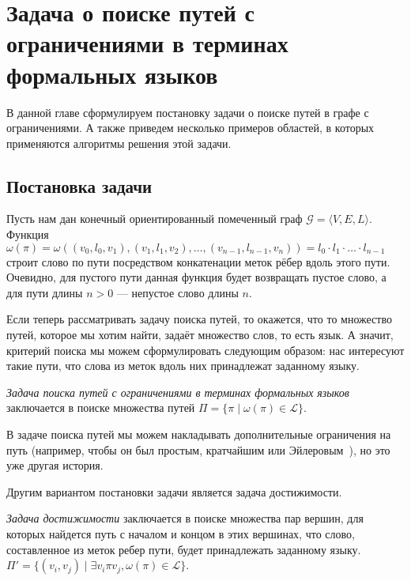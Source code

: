 \section{Задача о поиске путей с ограничениями в терминах формальных языков}



В данной главе сформулируем постановку задачи о поиске путей в графе с ограничениями. 
А также приведем несколько примеров областей, в которых применяются алгоритмы решения этой задачи.

\subsection{Постановка задачи }


Пусть нам дан конечный ориентированный помеченный граф $\mathcal{G}=\langle V,E,L \rangle$.
Функция $\omega(\pi) = \omega((v_0, l_0, v_1),(v_1,l_1,v_2),\dots,(v_{n-1},l_{n-1},v_n)) = l_0 \cdot l_1 \cdot \ldots \cdot l_{n-1} $ строит слово по пути посредством конкатенации меток рёбер вдоль этого пути.
Очевидно, для пустого пути данная функция будет возвращать пустое слово, а для пути длины $n  > 0$ --- непустое слово длины $n$.

Если теперь рассматривать задачу поиска путей, то окажется, что то множество путей, которое мы хотим найти, задаёт множество слов, то есть язык.
А значит, критерий поиска мы можем сформулировать следующим образом: нас интересуют такие пути, что слова из меток вдоль них принадлежат заданному языку.
\begin{definition}
	\textit{Задача поиска путей с ограничениями в терминах формальных языков} заключается в поиске множества путей $\Pi = \{\pi \mid \omega(\pi) \in \mathcal{L}\}$.
	
\end{definition}

В задаче поиска путей мы можем накладывать дополнительные ограничения на путь (например, чтобы он был простым, кратчайшим или Эйлеровым~\cite{kupferman2016eulerian}), но это уже другая история.

Другим вариантом постановки задачи является задача достижимости.

\begin{definition}
	\textit{Задача достижимости} заключается в поиске множества пар вершин, для которых найдется путь с началом и концом в этих вершинах, что слово, составленное из меток ребер пути, будет принадлежать заданному языку.
	$\Pi' = \{(v_{i}, v_{j}) \mid \exists v_{i} \pi v_{j}, \omega(\pi) \in \mathcal{L}\}$.
	
\end{definition}

